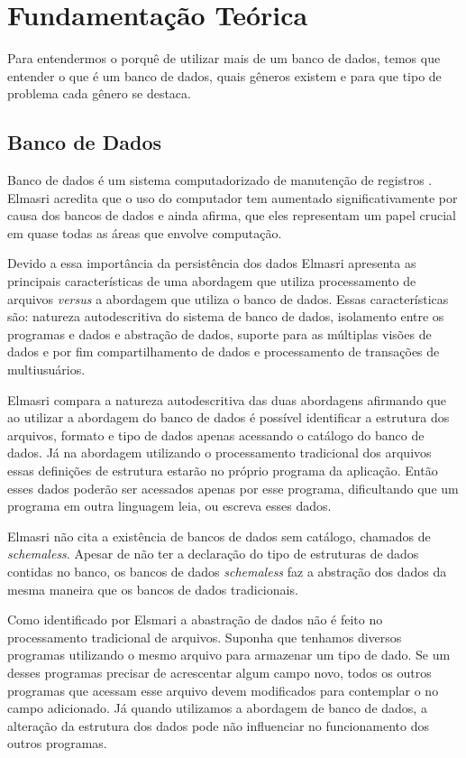 %
%

\chapter{Fundamentação Teórica}
\label{chap:fundamentacaoTeorica}

Para entendermos o porquê de utilizar mais de um banco de dados, temos que entender o que é um banco de dados, quais gêneros existem e para que tipo de problema cada gênero se destaca.


\section{Banco de Dados}
\label{sec:database}

Banco de dados é um sistema computadorizado de manutenção de registros \cite{CJDate}. Elmasri \cite{Elmasri} acredita que o uso do computador tem aumentado significativamente por causa dos bancos de dados e ainda afirma, que eles representam um papel crucial em quase todas as áreas que envolve computação.

Devido a essa importância da persistência dos dados Elmasri apresenta as principais características de uma abordagem que utiliza processamento de arquivos \textit{versus} a abordagem que utiliza o banco de dados. Essas características são: natureza autodescritiva do sistema de banco de dados, isolamento entre os programas e dados e abstração de dados, suporte para as múltiplas visões de dados e por fim compartilhamento de dados e processamento de transações de multiusuários.

Elmasri compara a natureza autodescritiva das duas abordagens afirmando que ao utilizar a abordagem do banco de dados é possível identificar a estrutura dos arquivos, formato e tipo de dados apenas acessando o catálogo do banco de dados. Já na abordagem utilizando o processamento tradicional dos arquivos essas definições de estrutura estarão no próprio programa da aplicação. Então esses dados poderão ser acessados apenas por esse programa, dificultando que um programa em outra linguagem leia, ou escreva esses dados.

Elmasri não cita a existência de bancos de dados sem catálogo, chamados de \textit{schemaless}. Apesar de não ter a declaração do tipo de estruturas de dados contidas no banco, os bancos de dados \textit{schemaless} faz a abstração dos dados da mesma maneira que os bancos de dados tradicionais.

Como identificado por Elsmari a abastração de dados não é feito no processamento tradicional de arquivos. Suponha que tenhamos diversos programas utilizando o mesmo arquivo para armazenar um tipo de dado. Se um desses programas precisar de acrescentar algum campo novo, todos os outros programas que acessam esse arquivo devem modificados para contemplar o no campo adicionado.
Já quando utilizamos a abordagem de banco de dados, a alteração da estrutura dos dados pode não influenciar no funcionamento dos outros programas.

